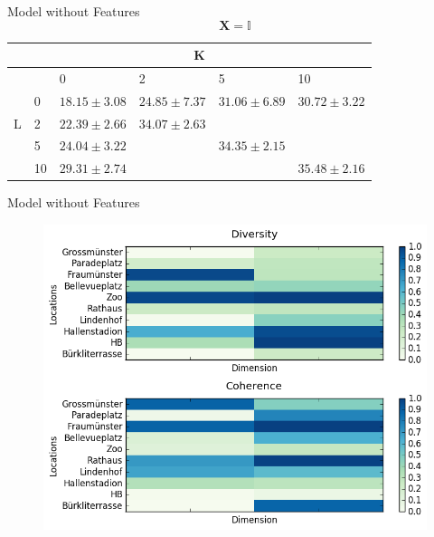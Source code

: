\documentclass{beamer}
\begin{document}
\begin{frame}{Model without Features}
  \begin{equation*}
    \bm{X} = \mathbb{I}
  \end{equation*}
  
  \begin{table}
    \begin{tabular}{l|lllll}
      \hline
      & \multicolumn{5}{c}{K} \\
      \hline
      \multirow{5}{*}{L} & & 0 & 2 & 5 & 10 \\
      & 0 & $18.15 \pm 3.08$ & $24.85 \pm 7.37$ & $31.06 \pm 6.89$ & $30.72 \pm 3.22$ \\
      & 2 & $22.39 \pm 2.66$ & $\bm{34.07 \pm 2.63}$ &&\\
      & 5 & $24.04 \pm 3.22$ && $34.35 \pm 2.15$ &\\
      & 10 & $29.31 \pm 2.74$ &&& $35.48 \pm 2.16$ \\
    \end{tabular}
  \end{table}
\end{frame}

\begin{frame}{Model without Features}
  \begin{figure}
    \centering
    \includegraphics[height=0.8\textheight]{submodular_weights_f_0_l_dim_2_k_dim_2}
  \end{figure}
\end{frame}
\end{document}
